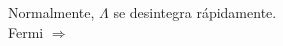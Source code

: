 \documentclass[preview]{standalone}
\begin{document}
\begin{center}
Normalmente, $\Lambda$ se desintegra rápidamente.\\
                    Fermi $\Rightarrow$
\end{center}
\end{document}
